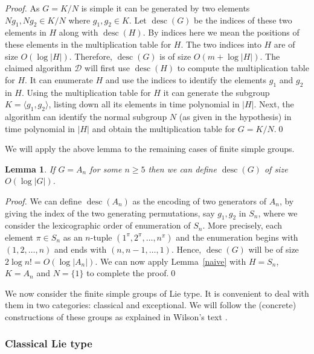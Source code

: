 \documentclass{elsarticle}
\newtheorem{lemma}[theorem]{Lemma}
\newcommand{\desc}{\mathop{\mathrm{desc}}}
\renewcommand{\angle}[1]{\langle#1\rangle} %
\begin{document}
\begin{proof}
  As $G=K/N$ is simple it can be generated by two elements
  $Ng_1,Ng_2\in K/N$ where $g_1,g_2\in K$. Let $\desc(G)$ be the
  indices of these two elements in $H$ along with $\desc(H)$.  By
  indices here we mean the positions of these elements in the
  multiplication table for $H$. The two indices into $H$ are of size
  $O(\log |H|)$. Therefore, $\desc(G)$ is of size $O(m + \log
  |H|)$. The claimed algorithm $\mathcal{D}$ will first use $\desc(H)$
  to compute the multiplication table for $H$. It can enumerate $H$
  and use the indices to identify the elements $g_1$ and $g_2$ in $H$.
  Using the multiplication table for $H$ it can generate the subgroup
  $K=\angle{g_1,g_2}$, listing down all its elements in time
  polynomial in $|H|$. Next, the algorithm can identify the normal
  subgroup $N$ (as given in the hypothesis) in time polynomial in
  $|H|$ and obtain the multiplication table for $G=K/N$.\qed
\end{proof}

We will apply the above lemma to the remaining cases of finite simple
groups.

\begin{lemma}\label{altern}
  If $G=A_n$ for some $n\ge 5$ then we can define $\desc(G)$
of size $O(\log |G|)$.
\end{lemma}

\begin{proof}
  We can define $\desc(A_n)$ as the encoding of two generators of
  $A_n$, by giving the index of the two generating permutations, say
  $g_1,g_2$ in $S_n$, where we consider the lexicographic order of
  enumeration of $S_n$. More precisely, each element $\pi\in S_n$ as
  an $n$-tuple $(1^\pi,2^\pi,\ldots,n^\pi)$ and the enumeration begins
  with $(1,2,\ldots,n)$ and ends with $(n,n-1,\ldots,1)$. Hence,
  $\desc(G)$ will be of size $2\log n! =O(\log |A_n|)$. We can now
  apply Lemma~\ref{naive} with $H=S_n$, $K=A_n$ and $N=\{1\}$ to
  complete the proof.\qed
\end{proof}

We now consider the finite simple groups of Lie type. It is convenient
to deal with them in two categories: classical and exceptional. We
will follow the (concrete) constructions of these groups as
explained in Wilson's text \cite{Wilson-book}.

\subsubsection{Classical Lie type}
\end{document}
